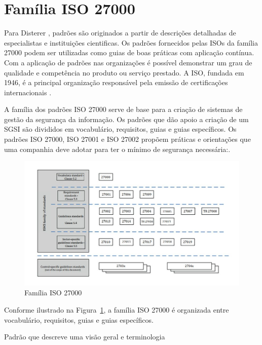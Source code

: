 \section{\label{sec:secao1}Família ISO 27000}




Para Disterer \cite{disterer2013}, padrões são originados a partir de descrições detalhadas de especialistas e instituições cientificas. Os padrões fornecidos pelas ISOs da família 27000 podem ser utilizadas como guias de boas práticas com aplicação contínua. Com a aplicação de padrões nas organizações é possível demonstrar um grau de qualidade e competência no produto ou serviço prestado. A ISO, fundada em 1946, é a principal organização responsável pela emissão de certificações internacionais \cite{disterer2013}. 




A família dos padrões ISO 27000 serve de base para a criação de sistemas de gestão da segurança da informação. Os padrões que dão apoio a criação de um SGSI  são divididos em vocabulário, requisitos, guias e guias específicos. Os padrões ISO 27000, ISO 27001 e ISO 27002 propõem práticas e orientações que uma companhia deve adotar para ter o mínimo de segurança necessária:\cite{disterer2013, ISOPDF}.


\begin{figure}
    \centering
    \includegraphics[scale=0.55]{fig/ISO27000.JPG}
    \caption{Família ISO 27000}
    \label{fig:testeISO}
\end{figure}


Conforme ilustrado na Figura~\ref{fig:testeISO}, a família ISO 27000 é organizada entre vocabulário, requisitos, guias e guias específicos.  


\item{Padrão que descreve uma visão geral e terminologia}

